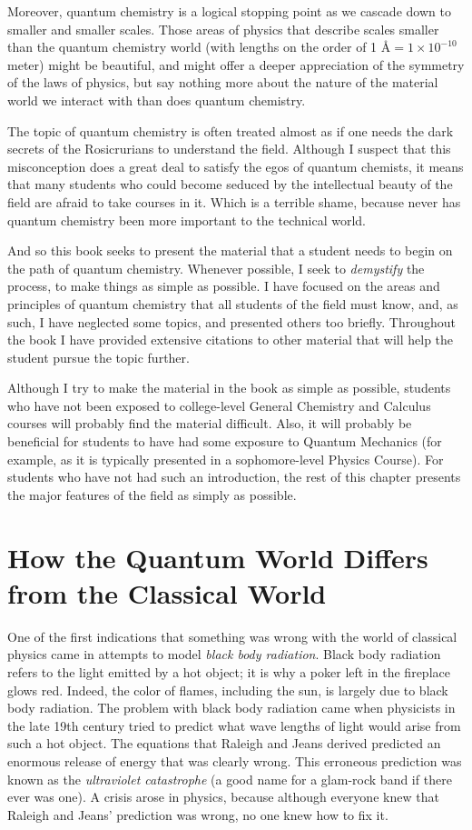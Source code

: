 Moreover, quantum chemistry is a logical stopping point as we cascade
down to smaller and smaller scales. Those areas of physics that
describe scales smaller than the quantum chemistry world (with lengths
on the order of 1 \AA $ = 1\times 10^{-10}$ meter) might be beautiful,
and might offer a deeper appreciation of the symmetry of the laws of
physics, but say nothing more about the nature of the material world
we interact with than does quantum chemistry.

The topic of quantum chemistry is often treated almost as if one needs
the dark secrets of the Rosicrurians to understand the field. Although
I suspect that this misconception does a great deal to satisfy the
egos of quantum chemists, it means that many students who could become
seduced by the intellectual beauty of the field are afraid to take
courses in it. Which is a terrible shame, because never has quantum
chemistry been more important to the technical world.

And so this book seeks to present the material that a student needs to
begin on the path of quantum chemistry. Whenever possible, I seek to
\emph{demystify} the process, to make things as simple as possible. I
have focused on the areas and principles of quantum chemistry that all
students of the field must know, and, as such, I have neglected some
topics, and presented others too briefly. Throughout the book I have
provided extensive citations to other material that will help the
student pursue the topic further.

Although I try to make the material in the book as simple as possible,
students who have not been exposed to college-level General
Chemistry and Calculus courses will probably find the material 
difficult. Also, it will probably be beneficial for students to have
had some exposure to Quantum Mechanics (for example, as it is
typically presented in a sophomore-level Physics Course). For students
who have not had such an introduction, the rest of this chapter
presents the major features of the field as simply as possible.

\section{How the Quantum World Differs from the Classical World}
One of the first indications that something was wrong with the world
of classical physics came in attempts to model \emph{black body
radiation}. Black body radiation refers to the light emitted by a hot
object; it is why a poker left in the fireplace glows red. Indeed, the
color of flames, including the sun, is largely due to black body
radiation. The problem with black body radiation came when physicists
in the late 19th century tried to predict what wave lengths of light
would arise from such a hot object. The equations that Raleigh and
Jeans derived predicted an enormous release of energy that was clearly
wrong. This erroneous prediction was known as the \emph{ultraviolet
catastrophe} (a good name for a glam-rock band if there ever was
one). A crisis arose in physics, because although everyone knew that
Raleigh and Jeans' prediction was wrong, no one knew how to fix it. 

